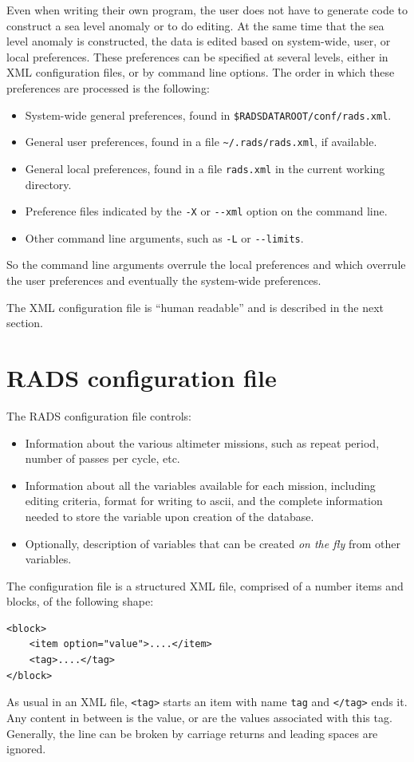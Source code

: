\documentclass[a4paper,11pt,openany,natbib,nomargin]{thesis}
\begin{document}
Even when writing their own program, the user does not have to generate code to construct a sea level anomaly or to do editing. At the same time that the sea level anomaly is constructed, the data is edited based on system-wide, user, or local preferences. These preferences can be specified at several levels, either in XML configuration files, or by command line options. The order in which these preferences are processed is the following:
\begin{itemize}
\item System-wide general preferences, found in \verb|$RADSDATAROOT/conf/rads.xml|.
\item General user preferences, found in a file \verb|~/.rads/rads.xml|, if available.
\item General local preferences, found in a file \verb|rads.xml| in the current working directory.
\item Preference files indicated by the \verb|-X| or \verb|--xml| option on the command line.
\item Other command line arguments, such as \verb|-L| or \verb|--limits|.
\end{itemize}
So the command line arguments overrule the local preferences and which overrule the user preferences and eventually the system-wide preferences.

The XML configuration file is ``human readable'' and is described in the next section.

\section{RADS configuration file}
\label{sec:rads.xml}
The RADS configuration file  controls:
\begin{itemize}
\item Information about the various altimeter missions, such as repeat period, number of passes per cycle, etc.
\item Information about all the variables available for each mission, including editing criteria, format for writing to ascii, and the complete information needed to store the variable upon creation of the database.
\item Optionally, description of variables that can be created \emph{on the fly} from other variables.
\end{itemize}

The configuration file is a structured XML file, comprised of a number items and blocks, of the following shape:
\begin{verbatim}
<block>
    <item option="value">....</item>
    <tag>....</tag>
</block>
\end{verbatim}
As usual in an XML file, \verb|<tag>| starts an item with name \verb|tag| and \verb|</tag>| ends it. Any content in between is the value, or are the values associated with this tag. Generally, the line can be broken by carriage returns and leading spaces are ignored.
\end{document}
